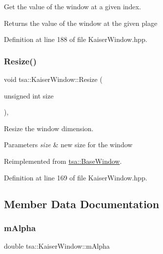 Get the value of the window at a given index.

\begin{DoxyReturn}{Returns}
the value of the window at the given plage 
\end{DoxyReturn}


Definition at line 188 of file Kaiser\+Window.\+hpp.

\mbox{\label{classtsa_1_1_kaiser_window_ae573c5ab979c3292d10feddc5180b6b4}} 
\subsubsection{\texorpdfstring{Resize()}{Resize()}}
{\footnotesize\ttfamily void tsa\+::\+Kaiser\+Window\+::\+Resize (\begin{DoxyParamCaption}\item[{unsigned int}]{size }\end{DoxyParamCaption})\hspace{0.3cm}{\ttfamily [inline]}, {\ttfamily [virtual]}}

Resize the window dimension.


\begin{DoxyParams}{Parameters}
{\em size} & new size for the window \\
\hline
\end{DoxyParams}


Reimplemented from \hyperlink{classtsa_1_1_base_window_a8a2a3425f2915762d50fa57dd0e04f22}{tsa\+::\+Base\+Window}.



Definition at line 169 of file Kaiser\+Window.\+hpp.



\subsection{Member Data Documentation}
\mbox{\label{classtsa_1_1_kaiser_window_a92c5708ea950eaf9845b13f2272cf43f}} 
\subsubsection{\texorpdfstring{m\+Alpha}{mAlpha}}
{\footnotesize\ttfamily double tsa\+::\+Kaiser\+Window\+::m\+Alpha\hspace{0.3cm}{\ttfamily [private]}}




